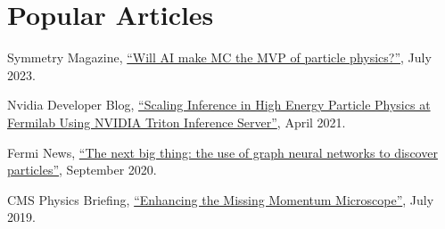 \section{Popular Articles}
\begin{description}[leftmargin=12pt,font=\normalfont,labelsep=0em]
\item Symmetry Magazine, \href{https://www.symmetrymagazine.org/article/will-ai-make-mc-the-mvp-of-particle-physics}{``Will AI make MC the MVP of particle physics?''}, July 2023.
\item Nvidia Developer Blog, \href{https://developer.nvidia.com/blog/scaling-inference-in-high-energy-particle-physics-at-fermilab-using-nvidia-triton-inference-server/}{``Scaling Inference in High Energy Particle Physics at Fermilab Using NVIDIA Triton Inference Server''}, April 2021.
\item Fermi News, \href{https://news.fnal.gov/2020/09/the-next-big-thing-the-use-of-graph-neural-networks-to-discover-particles/}{``The next big thing: the use of graph neural networks to discover particles''}, September 2020.
\item CMS Physics Briefing, \href{https://cms.cern/news/enhancing-missing-momentum-microscope}{``Enhancing the Missing Momentum Microscope''}, July 2019.
\end{description}

\ifdefined\longflag
{}
